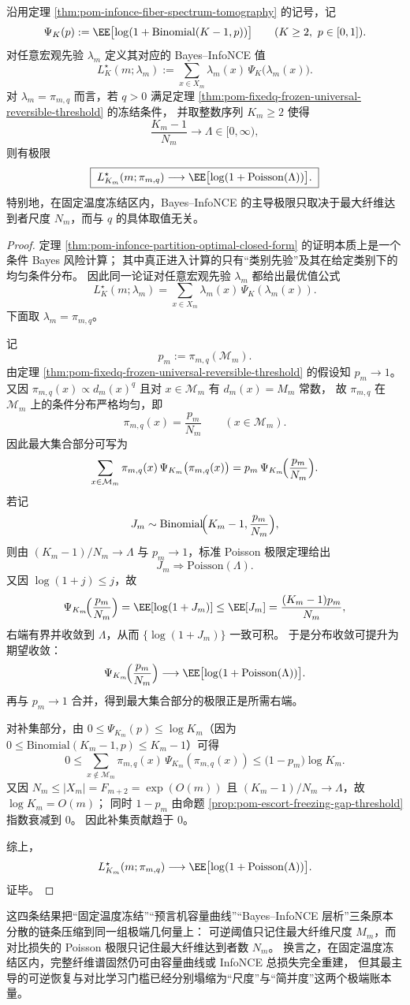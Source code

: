 \begin{theorem}\label{thm:pom-fixedq-frozen-bayes-infonce-poisson}
沿用定理 \ref{thm:pom-infonce-fiber-spectrum-tomography} 的记号，记
\[
\Psi_K(p):=\EE\bigl[\log(1+\mathrm{Binomial}(K-1,p))\bigr]
\qquad(K\ge 2,\ p\in[0,1]).
\]
对任意宏观先验 \(\lambda_m\) 定义其对应的 Bayes--InfoNCE 值
\[
L_K^\star(m;\lambda_m)
:=
\sum_{x\in X_m}\lambda_m(x)\,\Psi_K\bigl(\lambda_m(x)\bigr).
\]
对 \(\lambda_m=\pi_{m,q}\) 而言，若 \(q>0\) 满足定理 \ref{thm:pom-fixedq-frozen-universal-reversible-threshold} 的冻结条件，
并取整数序列 \(K_m\ge 2\) 使得
\[
\frac{K_m-1}{N_m}\longrightarrow \Lambda\in[0,\infty),
\]
则有极限
\[
\boxed{\;
L_{K_m}^\star(m;\pi_{m,q})
\longrightarrow
\EE\bigl[\log(1+\mathrm{Poisson}(\Lambda))\bigr].
\;}
\]
特别地，在固定温度冻结区内，Bayes--InfoNCE 的主导极限只取决于最大纤维达到者尺度 \(N_m\)，而与 \(q\) 的具体取值无关。
\end{theorem}
\begin{proof}
定理 \ref{thm:pom-infonce-partition-optimal-closed-form} 的证明本质上是一个条件 Bayes 风险计算；
其中真正进入计算的只有“类别先验”及其在给定类别下的均匀条件分布。
因此同一论证对任意宏观先验 \(\lambda_m\) 都给出最优值公式
\[
L_K^\star(m;\lambda_m)
=
\sum_{x\in X_m}\lambda_m(x)\,\Psi_K(\lambda_m(x)).
\]
下面取 \(\lambda_m=\pi_{m,q}\)。
\par
记
\[
p_m:=\pi_{m,q}(\mathcal M_m).
\]
由定理 \ref{thm:pom-fixedq-frozen-universal-reversible-threshold} 的假设知 \(p_m\to 1\)。
又因 \(\pi_{m,q}(x)\propto d_m(x)^q\) 且对 \(x\in\mathcal M_m\) 有 \(d_m(x)=M_m\) 常数，
故 \(\pi_{m,q}\) 在 \(\mathcal M_m\) 上的条件分布严格均匀，即
\[
\pi_{m,q}(x)=\frac{p_m}{N_m}
\qquad (x\in\mathcal M_m).
\]
因此最大集合部分可写为
\[
\sum_{x\in\mathcal M_m}\pi_{m,q}(x)\,\Psi_{K_m}\bigl(\pi_{m,q}(x)\bigr)
=
p_m\,\Psi_{K_m}\!\Bigl(\frac{p_m}{N_m}\Bigr).
\]
若记
\[
J_m\sim \mathrm{Binomial}\!\Bigl(K_m-1,\frac{p_m}{N_m}\Bigr),
\]
则由 \((K_m-1)/N_m\to\Lambda\) 与 \(p_m\to 1\)，标准 Poisson 极限定理给出
\[
J_m\Longrightarrow \mathrm{Poisson}(\Lambda).
\]
又因 \(\log(1+j)\le j\)，故
\[
\Psi_{K_m}\!\Bigl(\frac{p_m}{N_m}\Bigr)
=
\EE[\log(1+J_m)]
\le
\EE[J_m]
=
\frac{(K_m-1)p_m}{N_m},
\]
右端有界并收敛到 \(\Lambda\)，从而 \(\{\log(1+J_m)\}\) 一致可积。
于是分布收敛可提升为期望收敛：
\[
\Psi_{K_m}\!\Bigl(\frac{p_m}{N_m}\Bigr)
\longrightarrow
\EE\bigl[\log(1+\mathrm{Poisson}(\Lambda))\bigr].
\]
再与 \(p_m\to 1\) 合并，得到最大集合部分的极限正是所需右端。
\par
对补集部分，由 \(0\le \Psi_{K_m}(p)\le \log K_m\)（因为 \(0\le \mathrm{Binomial}(K_m-1,p)\le K_m-1\)）可得
\[
0\le
\sum_{x\notin\mathcal M_m}\pi_{m,q}(x)\,\Psi_{K_m}(\pi_{m,q}(x))
\le
\bigl(1-p_m\bigr)\log K_m.
\]
又因 \(N_m\le |X_m|=F_{m+2}=\exp(O(m))\) 且 \((K_m-1)/N_m\to\Lambda\)，故 \(\log K_m=O(m)\)；
同时 \(1-p_m\) 由命题 \ref{prop:pom-escort-freezing-gap-threshold} 指数衰减到 \(0\)。
因此补集贡献趋于 \(0\)。
\par
综上，
\[
L_{K_m}^\star(m;\pi_{m,q})
\longrightarrow
\EE\bigl[\log(1+\mathrm{Poisson}(\Lambda))\bigr].
\]
证毕。
\end{proof}

这四条结果把“固定温度冻结”“预言机容量曲线”“Bayes--InfoNCE 层析”三条原本分散的链条压缩到同一组极端几何量上：
可逆阈值只记住最大纤维尺度 \(M_m\)，而对比损失的 Poisson 极限只记住最大纤维达到者数 \(N_m\)。
换言之，在固定温度冻结区内，完整纤维谱固然仍可由容量曲线或 InfoNCE 总损失完全重建，
但其最主导的可逆恢复与对比学习门槛已经分别塌缩为“尺度”与“简并度”这两个极端账本量。
